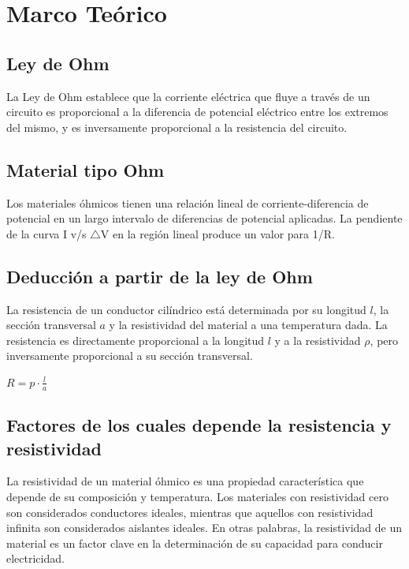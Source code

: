 \documentclass[letterpaper, 12pt]{article}
\begin{document}

\section{Marco Teórico}

\subsection*{Ley de Ohm}

La Ley de Ohm establece que la corriente eléctrica que fluye a través de un
circuito es proporcional a la diferencia de potencial eléctrico entre los
extremos del mismo, y es inversamente proporcional a la resistencia del
circuito.~\cite{LeyDeOhm}

\subsection*{Material tipo Ohm}

Los materiales óhmicos tienen una relación lineal de corriente-diferencia de
potencial en un largo intervalo de diferencias de potencial aplicadas.
La pendiente de la curva I v/s $\triangle$V en la región lineal produce un
valor para 1/R.~\cite{MaterialesOhmicos}

\subsection*{Deducción a partir de la ley de Ohm}

La resistencia de un conductor cilíndrico está determinada por su longitud $l$,
la sección transversal $a$ y la resistividad del material a una temperatura dada.
La resistencia es directamente proporcional a la longitud $l$ y a la
resistividad $\rho$, pero inversamente proporcional a su sección transversal.

$R = p \cdot \frac{l}{a}$

\subsection*{Factores de los cuales depende la resistencia y resistividad}

La resistividad de un material óhmico es una propiedad característica que
depende de su composición y temperatura. Los materiales con resistividad
cero son considerados conductores ideales, mientras que aquellos con
resistividad infinita son considerados aislantes ideales. En otras
palabras, la resistividad de un material es un factor clave en la
determinación de su capacidad para conducir electricidad.
\end{document}
